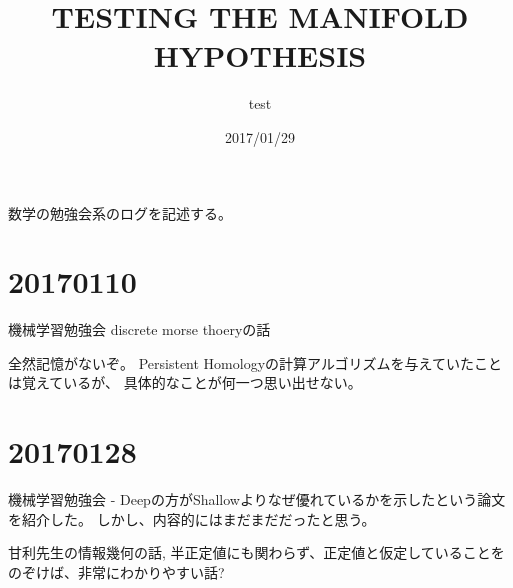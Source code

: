 \documentclass{ujarticle}
\title{TESTING THE MANIFOLD HYPOTHESIS}
\author{test}
\date{2017/01/29}
\begin{document}
数学の勉強会系のログを記述する。


\section{20170110}
\label{sec:20170110}
機械学習勉強会
discrete morse thoeryの話

全然記憶がないぞ。
Persistent Homologyの計算アルゴリズムを与えていたことは覚えているが、
具体的なことが何一つ思い出せない。

\section{20170128}
\label{sec:20170128}
機械学習勉強会
- Deepの方がShallowよりなぜ優れているかを示したという論文を紹介した。
しかし、内容的にはまだまだだったと思う。

甘利先生の情報幾何の話,
半正定値にも関わらず、正定値と仮定していることをのぞけば、非常にわかりやすい話?
\end{document}
